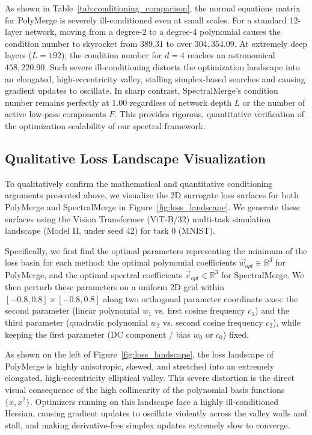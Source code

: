 \documentclass{article}
\theoremstyle{plain}
\theoremstyle{definition}
\theoremstyle{remark}
\begin{document}
As shown in Table~\ref{tab:conditioning_comparison}, the normal equations matrix for PolyMerge is severely ill-conditioned even at small scales. For a standard 12-layer network, moving from a degree-2 to a degree-4 polynomial causes the condition number to skyrocket from $389.31$ to over $304,354.09$. At extremely deep layers ($L=192$), the condition number for $d=4$ reaches an astronomical $458,220.90$. Such severe ill-conditioning distorts the optimization landscape into an elongated, high-eccentricity valley, stalling simplex-based searches and causing gradient updates to oscillate. In sharp contrast, SpectralMerge's condition number remains perfectly at $1.00$ regardless of network depth $L$ or the number of active low-pass components $F$. This provides rigorous, quantitative verification of the optimization scalability of our spectral framework.

\subsection{Qualitative Loss Landscape Visualization}
\label{app:loss_landscape}

To qualitatively confirm the mathematical and quantitative conditioning arguments presented above, we visualize the 2D surrogate loss surfaces for both PolyMerge and SpectralMerge in Figure~\ref{fig:loss_landscape}. We generate these surfaces using the Vision Transformer (ViT-B/32) multi-task simulation landscape (Model II, under seed 42) for task 0 (MNIST).

Specifically, we first find the optimal parameters representing the minimum of the loss basin for each method: the optimal polynomial coefficients $\vec{w}_{opt} \in \mathbb{R}^3$ for PolyMerge, and the optimal spectral coefficients $\vec{c}_{opt} \in \mathbb{R}^3$ for SpectralMerge. We then perturb these parameters on a uniform 2D grid within $[-0.8, 0.8] \times [-0.8, 0.8]$ along two orthogonal parameter coordinate axes: the second parameter (linear polynomial $w_1$ vs. first cosine frequency $c_1$) and the third parameter (quadratic polynomial $w_2$ vs. second cosine frequency $c_2$), while keeping the first parameter (DC component / bias $w_0$ or $c_0$) fixed.

As shown on the left of Figure~\ref{fig:loss_landscape}, the loss landscape of PolyMerge is highly anisotropic, skewed, and stretched into an extremely elongated, high-eccentricity elliptical valley. This severe distortion is the direct visual consequence of the high collinearity of the polynomial basis functions $\{x, x^2\}$. Optimizers running on this landscape face a highly ill-conditioned Hessian, causing gradient updates to oscillate violently across the valley walls and stall, and making derivative-free simplex updates extremely slow to converge.
\end{document}
